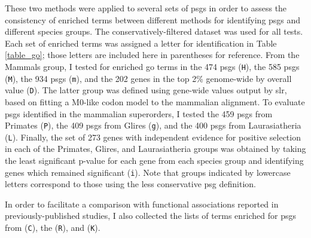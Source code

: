 These two methods were applied to several sets of \acp{psg} in order
to assess the consistency of enriched terms between different methods
for identifying \acp{psg} and different species groups. The
conservatively-filtered dataset was used for all tests. Each set of
enriched terms was assigned a letter for identification in Table
\ref{table_go}; those letters are included here in parentheses for
reference. From the Mammals group, I tested for enriched \ac{go} terms
in the 474 \psghoch \acp{psg} (\texttt{H}), the 585 \psgeone \acp{psg}
(\texttt{M}), the 934 \psgefive \acp{psg} (\texttt{m}), and the 202
genes in the top 2\% genome-wide by overall \dnds value
(\texttt{D}). The latter group was defined using gene-wide \dnds
values output by \ac{slr}, based on fitting a M0-like codon model to
the mammalian alignment. To evaluate \acp{psg} identified in the
mammalian superorders, I tested the 459 \psgeone \acp{psg} from
Primates (\texttt{P}), the 409 \psgefive \acp{psg} from Glires
(\texttt{g}), and the 400 \psgeone \acp{psg} from Laurasiatheria
(\texttt{L}). Finally, the set of 273 genes with independent evidence
for positive selection in each of the Primates, Glires, and
Laurasiatheria groups was obtained by taking the least significant
\psgefive p-value for each gene from each species group and
identifying genes which remained significant (\texttt{i}). Note that
groups indicated by lowercase letters correspond to those using the
less conservative \psgefive \ac{psg} definition.

In order to facilitate a comparison with functional associations
reported in previously-published studies, I also collected the lists
of terms enriched for \acp{psg} from \citet{Clark2003} (\texttt{C}),
the \citet{Macaque2007} (\texttt{R}), and \citet{Kosiol2008}
(\texttt{K}).

